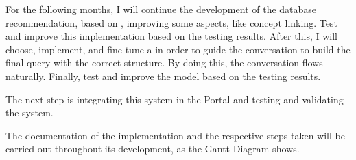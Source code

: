 For the following months, I will continue the development of the database recommendation, based on {\bm}, improving some aspects, like concept linking. Test and improve this {\ir} implementation based on the testing results. After this, I will choose, implement, and fine-tune a {\llm} in order to guide the conversation to build the final query with the correct structure. By doing this, the conversation flows naturally. Finally, test and improve the model based on the testing results.

The next step is integrating this system in the {\ehden} Portal and testing and validating the system. 

The documentation of the implementation and the respective steps taken will be carried out throughout its development, as the Gantt Diagram shows.
